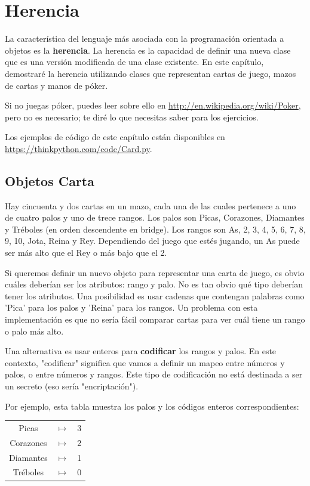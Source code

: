
\chapter{Herencia}

La característica del lenguaje más asociada con la programación orientada a objetos es la \textbf{herencia}. La herencia es la capacidad de definir una nueva clase que es una versión modificada de una clase existente. En este capítulo, demostraré la herencia utilizando clases que representan cartas de juego, mazos de cartas y manos de póker.

Si no juegas póker, puedes leer sobre ello en \url{http://en.wikipedia.org/wiki/Poker}, pero no es necesario; te diré lo que necesitas saber para los ejercicios.

Los ejemplos de código de este capítulo están disponibles en \url{https://thinkpython.com/code/Card.py}.

\section{Objetos Carta}

Hay cincuenta y dos cartas en un mazo, cada una de las cuales pertenece a uno de cuatro palos y uno de trece rangos. Los palos son Picas, Corazones, Diamantes y Tréboles (en orden descendente en bridge). Los rangos son As, 2, 3, 4, 5, 6, 7, 8, 9, 10, Jota, Reina y Rey. Dependiendo del juego que estés jugando, un As puede ser más alto que el Rey o más bajo que el 2.

Si queremos definir un nuevo objeto para representar una carta de juego, es obvio cuáles deberían ser los atributos: rango y palo. No es tan obvio qué tipo deberían tener los atributos. Una posibilidad es usar cadenas que contengan palabras como 'Pica' para los palos y 'Reina' para los rangos. Un problema con esta implementación es que no sería fácil comparar cartas para ver cuál tiene un rango o palo más alto.

Una alternativa es usar enteros para \textbf{codificar} los rangos y palos. En este contexto, "codificar" significa que vamos a definir un mapeo entre números y palos, o entre números y rangos. Este tipo de codificación no está destinada a ser un secreto (eso sería "encriptación").

Por ejemplo, esta tabla muestra los palos y los códigos enteros correspondientes:

\begin{center}
\begin{tabular}{|c|c|c|}
\hline
Picas    & $\mapsto$ & 3    \\
Corazones    & $\mapsto$ & 2    \\
Diamantes   & $\mapsto$ & 1    \\
Tréboles    & $\mapsto$ & 0    \\
\hline
\end{tabular}
\end{center}

